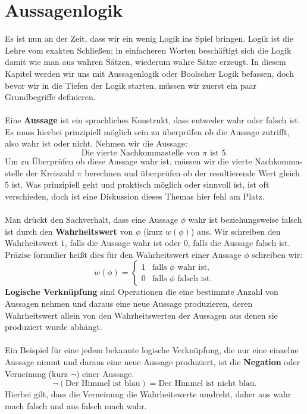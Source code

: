 \documentclass[11pt,a4paper,leqno]{report}
\numberwithin{equation}{chapter}
\begin{document}
\chapter{Aussagenlogik}
Es ist nun an der Zeit, dass wir ein wenig Logik ins Spiel bringen. Logik ist die Lehre vom exakten Schließen; in einfacheren Worten beschäftigt sich die Logik damit wie man aus wahren Sätzen, wiederum wahre Sätze erzeugt. In diesem Kapitel werden wir uns mit Aussagenlogik oder Boolscher Logik befassen, doch bevor wir in die Tiefen der Logik starten, müssen wir zuerst ein paar Grundbegriffe definieren.\\
\\
Eine \textbf{Aussage} ist ein sprachliches Konstrukt, dass entweder wahr oder falsch ist. Es muss hierbei prinzipiell möglich sein zu überprüfen ob die Aussage zutrifft, also wahr ist oder nicht. Nehmen wir die Aussage:
$$\text{Die vierte Nachkommastelle von }\pi\text{ ist $5$.}$$
Um zu Überprüfen ob diese Aussage wahr ist, müssen wir die vierte Nachkomma- stelle der Kreiszahl $\pi$ berechnen und überprüfen ob der resultierende Wert gleich $5$ ist. Was prinzipiell geht und praktisch möglich oder sinnvoll ist, ist oft verschieden, doch ist eine Diskussion dieses Themas hier fehl am Platz.\\
\\ 
Man drückt den Sachverhalt, dass eine Aussage $\phi$ wahr ist beziehungsweise falsch ist durch den \textbf{Wahrheitswert} von $\phi$ (kurz $w(\phi)$) aus. Wir schreiben den Wahrheitswert $1$, falls die Aussage wahr ist oder $0$, falls die Aussage falsch ist. Präzise formulier heißt dies für den Wahrheitswert einer Aussage $\phi$ schreiben wir:
$$w(\phi)=
\begin{cases} 
	1 & \text{falls $\phi$ wahr ist.} \\
	0 & \text{falls $\phi$ falsch ist.} 
\end{cases}
$$
\textbf{Logische Verknüpfung} sind Operationen die eine bestimmte Anzahl von Aussagen nehmen und daraus eine neue Aussage produzieren, deren Wahrheitswert allein von den Wahrheitswerten der Aussagen aus denen sie produziert wurde abhängt.\\
\\
Ein Beispiel für eine jedem bekannte logische Verknüpfung, die nur eine einzelne Aussage nimmt und daraus eine neue Aussage produziert, ist die \textbf{Negation} oder Verneinung (kurz $\neg$) einer Aussage. 
$$\neg(\text{Der Himmel ist blau}) = \text{Der Himmel ist nicht blau.}$$
Hierbei gilt, dass die Verneinung die Wahrheitswerte umdreht, daher aus wahr mach falsch und aus falsch mach wahr.
\end{document}

